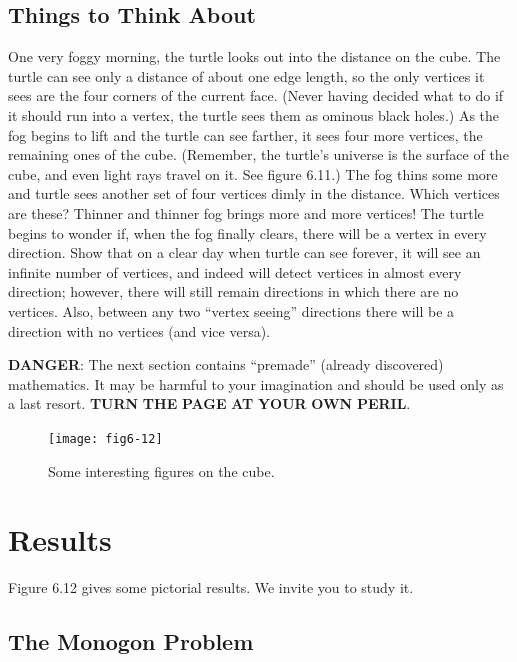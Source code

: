 \documentclass{book}
\begin{document}
\subsection{Things to Think About}

One very foggy morning, the turtle looks out into the distance on the
cube. The turtle can see only a distance of about one edge length, so
the only vertices it sees are the four corners of the current face. (Never
having decided what to do if it should run into a vertex, the turtle
sees them as ominous black holes.) As the fog begins to lift and the
turtle can see farther, it sees four more vertices, the remaining ones of
the cube. (Remember, the turtle's universe is the surface of the cube,
and even light rays travel on it. See figure 6.11.) The fog thins some
more and turtle sees another set of four vertices dimly in the distance.
Which vertices are these? Thinner and thinner fog brings more and more
vertices! The turtle begins to wonder if, when the fog finally clears, there
will be a vertex in every direction. Show that on a clear day when turtle
can see forever, it will see an infinite number of vertices, and indeed will
detect vertices in almost every direction; however, there will still remain
directions in which there are no vertices. Also, between any two ``vertex
seeing'' directions there will be a direction with no vertices (and vice
versa).

\textbf{DANGER}: The next section contains ``premade'' (already discovered)
mathematics. It may be harmful to your imagination and should be used
only as a last resort. \textbf{TURN}\textbf{ THE}\textbf{ PAGE}\textbf{ AT}\textbf{ YOUR}\textbf{ OWN}\textbf{ PERIL}.

\pagebreak

\begin{figure}
\begin{center}
\texttt{[image: fig6-12]}
\caption{Some interesting figures on the cube.}
\end{center}
\end{figure}

\section{Results}
Figure 6.12 gives some pictorial results. We invite you to study it.

\subsection{The Monogon Problem}
\end{document}
